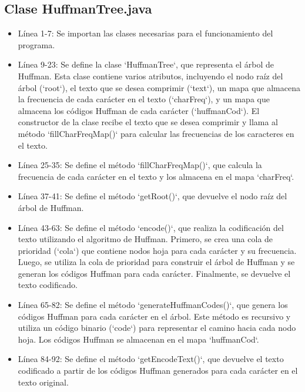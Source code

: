 \documentclass{article}
\begin{document}
\subsection{Clase HuffmanTree.java}

	
\begin{itemize}
	\item Línea 1-7: Se importan las clases necesarias para el funcionamiento del programa.

\item Línea 9-23: Se define la clase `HuffmanTree`, que representa el árbol de Huffman. Esta clase contiene varios atributos, incluyendo el nodo raíz del árbol (`root`), el texto que se desea comprimir (`text`), un mapa que almacena la frecuencia de cada carácter en el texto (`charFreq`), y un mapa que almacena los códigos Huffman de cada carácter (`huffmanCod`). El constructor de la clase recibe el texto que se desea comprimir y llama al método `fillCharFreqMap()` para calcular las frecuencias de los caracteres en el texto.

\item Línea 25-35: Se define el método `fillCharFreqMap()`, que calcula la frecuencia de cada carácter en el texto y los almacena en el mapa `charFreq`.

\item Línea 37-41: Se define el método `getRoot()`, que devuelve el nodo raíz del árbol de Huffman.

\item Línea 43-63: Se define el método `encode()`, que realiza la codificación del texto utilizando el algoritmo de Huffman. Primero, se crea una cola de prioridad (`cola`) que contiene nodos hoja para cada carácter y su frecuencia. Luego, se utiliza la cola de prioridad para construir el árbol de Huffman y se generan los códigos Huffman para cada carácter. Finalmente, se devuelve el texto codificado.

\item Línea 65-82: Se define el método `generateHuffmanCodes()`, que genera los códigos Huffman para cada carácter en el árbol. Este método es recursivo y utiliza un código binario (`code`) para representar el camino hacia cada nodo hoja. Los códigos Huffman se almacenan en el mapa `huffmanCod`.

\item Línea 84-92: Se define el método `getEncodeText()`, que devuelve el texto codificado a partir de los códigos Huffman generados para cada carácter en el texto original.


\end{itemize}
\end{document}
